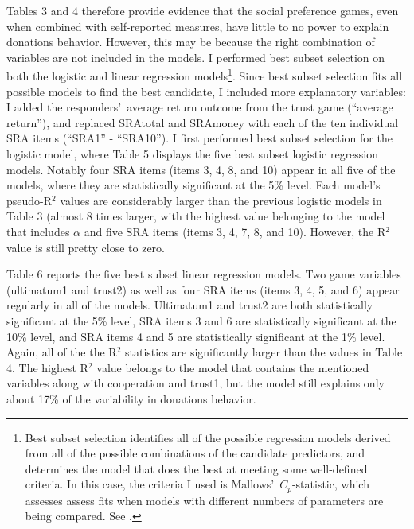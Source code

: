 \documentclass[12pt]{article}
\begin{document}
Tables 3 and 4 therefore provide evidence that the social preference games, even when combined with self-reported measures, have little to no power to explain donations behavior. However, this may be because the right combination of variables are not included in the models. I performed best subset selection on both the logistic and linear regression models\footnote{Best subset selection identifies all of the possible regression models derived from all of the possible combinations of the candidate predictors, and determines the model that does the best at meeting some well-defined criteria. In this case, the criteria I used is Mallows\rq \ \(C_{p}\)-statistic, which assesses assess fits when models with different numbers of parameters are being compared.  See \cite{mallows_1973}.}. Since best subset selection fits all possible models to find the best candidate, I included more explanatory variables: I added the responders\rq \ average return outcome from the trust game (``average return''), and replaced SRAtotal and SRAmoney with each of the ten individual SRA items (``SRA1'' - ``SRA10''). I first performed best subset selection for the logistic model, where Table 5 displays the five best subset logistic regression models. Notably four SRA items (items 3, 4, 8, and 10) appear in all five of the models, where they are statistically significant at the 5\% level. Each model\rq s pseudo-R$^{2}$ values are considerably larger than the previous logistic models in Table 3 (almost 8 times larger, with the highest value belonging to the model that includes \(\alpha\) and five SRA items (items 3, 4, 7, 8, and 10). However, the R$^{2}$ value is still pretty close to zero.

Table 6 reports the five best subset linear regression models. Two game variables (ultimatum1 and trust2) as well as four SRA items (items 3, 4, 5, and 6) appear regularly in all of the models. Ultimatum1 and trust2 are both statistically significant at the 5\% level, SRA items 3 and 6 are statistically significant at the 10\% level, and SRA items 4 and 5 are statistically significant at the 1\% level. Again, all of the the R$^{2}$ statistics are significantly larger than the values in Table 4. The highest R$^{2}$ value belongs to the model that contains the mentioned variables along with cooperation and trust1, but the model still explains only about 17\% of the variability in donations behavior.
\end{document}
